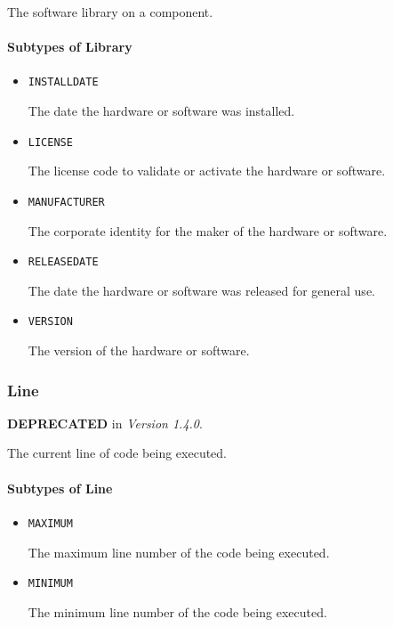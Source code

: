 The software library on a component.



\paragraph{Subtypes of Library}\mbox{}
\label{sec:Subtypes of Library}

\begin{itemize}

\item \texttt{INSTALL\textunderscore DATE}


The date the hardware or software was installed.

\item \texttt{LICENSE}


The license code to validate or activate the hardware or software.

\item \texttt{MANUFACTURER}


The corporate identity for the maker of the hardware or software.


\item \texttt{RELEASE\textunderscore DATE}


The date the hardware or software was released for general use.


\item \texttt{VERSION}


The version of the hardware or software.


\end{itemize}








\subsubsection{Line}
\label{sec:Line}



\textbf{DEPRECATED} in \textit{Version 1.4.0}.

The current line of code being executed.


\paragraph{Subtypes of Line}\mbox{}
\label{sec:Subtypes of Line}

\begin{itemize}

\item \texttt{MAXIMUM}


The maximum line number of the code being executed.

\item \texttt{MINIMUM}


The minimum line number of the code being executed.


\end{itemize}





